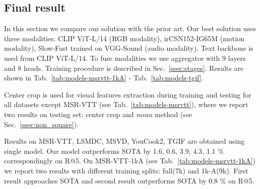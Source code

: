 \subsection{Final result} \label{ssec:final_result}
In this section we compare our solution with the prior art. Our best solution uses three modalities: CLIP ViT-L/14 (RGB modality), irCSN152-IG65M (motion modality), Slow-Fast trained on VGG-Sound (audio modality). Text backbone is used from CLIP ViT-L/14. To fuse modalities
we use aggregator with 9 layers and 8 heads. Training procedure is described in Sec.~\ref{ssec:stages}. Results are shown in Tab.~\ref{tab:models-msrvtt-1kA} - Tab.~\ref{tab:models-tgif}.

Center crop is used for visual features extraction during training and testing for all datasets except MSR-VTT (see Tab.~\ref{tab:models-msrvtt}), where we report two results on testing set: center crop and \textit{mean} method (see Sec.~\ref{ssec:non_square}).

Results on MSR-VTT, LSMDC, MSVD, YouCook2, TGIF are obtained using single model. Our model outperforms SOTA by 1.6, 0.6, 3.9, 4.3, 1.1 \% correspondingly on R@5. On MSR-VTT-1kA (see Tab.~\ref{tab:models-msrvtt-1kA}) we report two results with different training splits: full(7k) and 1k-A(9k). First result approaches SOTA and second result outperforms SOTA by 0.8 \% on R@5.



